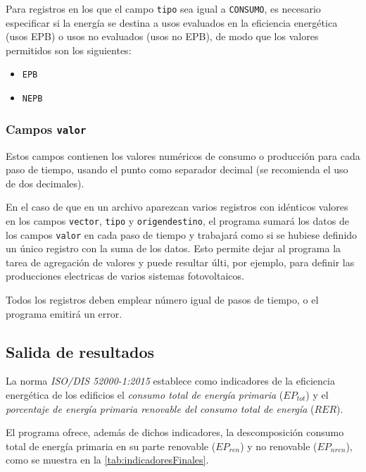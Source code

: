 \documentclass[10pt,notitlepage,oneside,a4paper]{article}
\begin{document}
Para registros en los que el campo \texttt{tipo} sea igual a \texttt{CONSUMO}, es necesario especificar si la energía se destina a usos evaluados en la eficiencia energética (usos EPB) o usos no evaluados (usos no EPB), de modo que los valores permitidos son los siguientes:

\begin{itemize}
\item \texttt{EPB}
\item \texttt{NEPB}
\end{itemize}

\subsubsection{Campos \texttt{valor}}

Estos campos contienen los valores numéricos de consumo o producción para cada paso de tiempo, usando el punto como separador decimal (se recomienda el uso de dos decimales).

En el caso de que en un archivo aparezcan varios registros con idénticos valores en los campos \texttt{vector}, \texttt{tipo} y \texttt{origendestino}, el programa sumará los datos de los campos \texttt{valor} en cada paso de tiempo y trabajará como si se hubiese definido un único registro con la suma de los datos. Esto permite dejar al programa la tarea de agregación de valores y puede resultar últi, por ejemplo, para definir las producciones electricas de varios sistemas fotovoltaicos.

Todos los registros deben emplear número igual de pasos de tiempo, o el programa emitirá un error.

\subsection{Salida de resultados}

La norma \textit{ISO/DIS 52000-1:2015} establece como indicadores de la eficiencia energética de los edificios el \textit{consumo total de energía primaria} (\texttt{$EP_{tot}$}) y el \textit{porcentaje de energía primaria renovable del consumo total de energía} (\texttt{$RER$}).

El programa ofrece, además de dichos indicadores, la descomposición consumo total de energía primaria en su parte renovable (\texttt{$EP_{ren}$}) y no renovable (\texttt{$EP_{nren}$}), como se muestra en la \autoref{tab:indicadoresFinales}.
\end{document}
